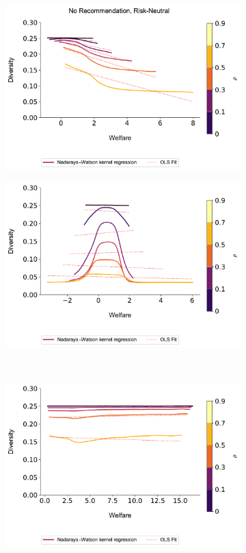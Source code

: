 \documentclass[manuscript]{acmart}
\begin{document}
\begin{figure}[ht]
\caption{Diversity vs. Welfare}
\begin{subfigure}{.3\textwidth}
\includegraphics[width=1.0\linewidth]{figures/diversity_welfare_rn_n_200.pdf}
\end{subfigure}
\begin{subfigure}{.3\textwidth}
\includegraphics[width=1.0\linewidth]{figures/diversity_welfare_ra_n_200.pdf}
\end{subfigure}\\
\begin{subfigure}{.3\textwidth}
\includegraphics[width=1.0\linewidth]{figures/diversity_welfare_rn_partial_n_200.pdf}

\end{subfigure}
\end{figure}
\end{document}
